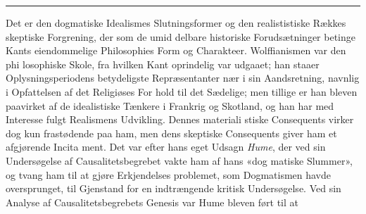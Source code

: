 \documentclass[12pt,a4paper]{book}
\newcommand{\divrule}{\begin{center}\rule{2cm}{0.4pt}\end{center}}
\begin{document}
\divrule

Det er den dogmatiske Idealismes Slutningsformer og den
realististiske Rækkes skeptiske Forgrening, der som de umid\-%
delbare historiske Forudsætninger betinge Kants eiendommelige
Philosophies Form og Charakteer. Wolffianismen var den phi\-%
losophiske Skole, fra hvilken Kant oprindelig var udgaaet; han
staaer Oplysningsperiodens betydeligste Repræsentanter nær i
sin Aandsretning, navnlig i Opfattelsen af det Religiøses For\-%
hold til det Sædelige; men tillige er han bleven paavirket af
de idealistiske Tænkere i Frankrig og Skotland, og han har
med Interesse fulgt Realismens Udvikling. Dennes materiali\-%
stiske Consequents virker dog kun frastødende paa ham, men
dens skeptiske Consequents giver ham et afgjørende Incita\-%
ment. Det var efter hans eget Udsagn \emph{Hume}, der ved sin
Undersøgelse af Causalitetsbegrebet vakte ham af hans «dog\-%
matiske Slummer», og tvang ham til at gjøre Erkjendelses\-%
problemet, som Dogmatismen havde oversprunget, til Gjenstand
for en indtrængende kritisk Undersøgelse. Ved sin Analyse
af Causalitetsbegrebets Genesis var Hume bleven ført til at
\end{document}
